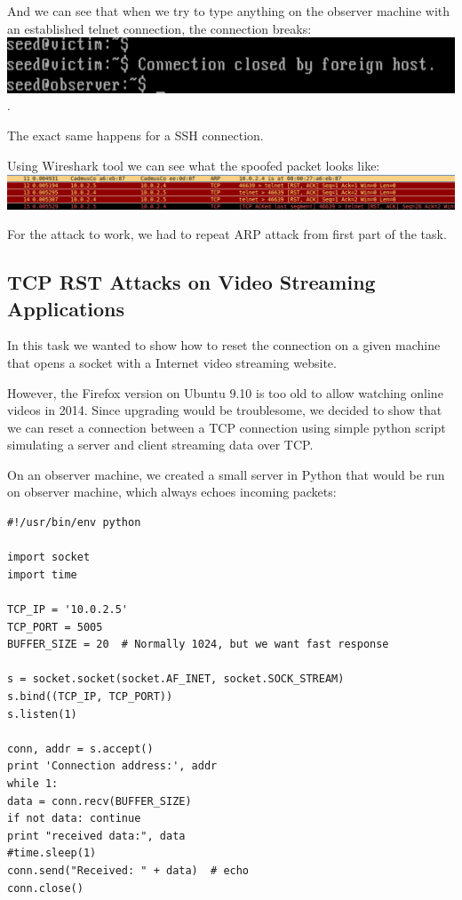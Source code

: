 \documentclass[12pt, a4paper, pdflatex]{article}
\begin{document}
And we can see that when we try to type anything on the observer machine with an established telnet connection, the connection breaks:\\
\includegraphics[width=.95\textwidth]{gfx/rst-reset.png}.

The exact same happens for a SSH connection.

Using Wireshark tool we can see what the spoofed packet looks like:\\
\includegraphics[width=.95\textwidth]{gfx/rst-spoofed.png}

For the attack to work, we had to repeat ARP attack from first part of the task.

\subsection{TCP RST Attacks on Video Streaming Applications}

In this task we wanted to show how to reset the connection on a given machine that opens a socket with a Internet video streaming website.

However, the Firefox version on Ubuntu 9.10 is too old to allow watching online videos in 2014. Since upgrading would be troublesome, we decided to show that we can reset a connection between a TCP connection using simple python script simulating a server and client streaming data over TCP.

On an observer machine, we created a small server in Python that would be run on observer machine, which always echoes incoming packets:\\

\lstset{
	captionpos=b,
	frame=single,
	language=Python,
	breaklines=true,
	label=youtube1
}
\begin{lstlisting}
#!/usr/bin/env python

import socket
import time

TCP_IP = '10.0.2.5'
TCP_PORT = 5005
BUFFER_SIZE = 20  # Normally 1024, but we want fast response

s = socket.socket(socket.AF_INET, socket.SOCK_STREAM)
s.bind((TCP_IP, TCP_PORT))
s.listen(1)

conn, addr = s.accept()
print 'Connection address:', addr
while 1:
data = conn.recv(BUFFER_SIZE)
if not data: continue
print "received data:", data
#time.sleep(1)
conn.send("Received: " + data)  # echo
conn.close()
\end{lstlisting}
\end{document}
